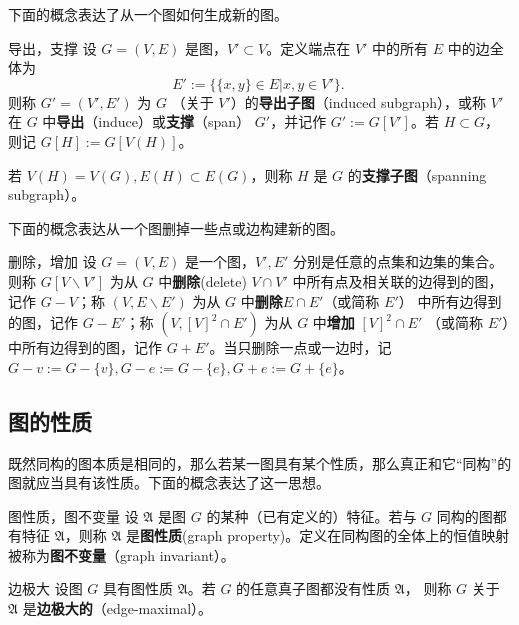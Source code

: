 下面的概念表达了从一个图如何生成新的图。

\begin{definition}{导出，支撑}
设 $G=(V,E)$ 是图，$V'\subset V$。定义端点在 $V'$ 中的所有 $E$ 中的边全体为
\begin{equation}
E':=\{\{x,y\}\in E|x,y\in V'\}.~
\end{equation}
则称 $G'=(V',E')$ 为 $G$ （关于 $V'$）的\textbf{导出子图}（induced subgraph），或称 $V'$ 在 $G$ 中\textbf{导出}（induce）或\textbf{支撑}（span） $G'$，并记作 $G':=G[V']$。若 $H\subset G$，则记 $G[H]:=G[V(H)]$。

若 $V(H)=V(G),E(H)\subset E(G)$，则称 $H$ 是 $G$ 的\textbf{支撑子图}（spanning subgraph）。
\end{definition}
下面的概念表达从一个图删掉一些点或边构建新的图。
\begin{definition}{删除，增加}
设 $G=(V,E)$ 是一个图，$V',E'$ 分别是任意的点集和边集的集合。则称 $G[V\backslash V']$ 为从 $G$ 中\textbf{删除}(delete) $V\cap V'$ 中所有点及相关联的边得到的图，记作 $G-V$；称
 $(V,E\backslash E')$ 为从 $G$ 中\textbf{删除}$E\cap E'$（或简称 $E'$） 中所有边得到的图，记作 $G-E'$；称 $(V,[V]^2\cap E')$ 为从 $G$ 中\textbf{增加} $[V]^2\cap E'$ （或简称 $E'$）中所有边得到的图，记作 $G+E'$。当只删除一点或一边时，记 $G-v:=G-\{v\},G-e:=G-\{e\},G+e:=G+\{e\}$。
\end{definition}





\subsection{图的性质}
既然同构的图本质是相同的，那么若某一图具有某个性质，那么真正和它“同构”的图就应当具有该性质。下面的概念表达了这一思想。
\begin{definition}{图性质，图不变量}
设 $\mathfrak A$ 是图 $G$ 的某种（已有定义的）特征。若与 $G$ 同构的图都有特征 $\mathfrak A$，则称 $\mathfrak A$ 是\textbf{图性质}(graph property)。定义在同构图的全体上的恒值映射被称为\textbf{图不变量}（graph invariant）。
\end{definition}

\begin{definition}{边极大}
设图 $G$ 具有图性质 $\mathfrak A$。若 $G$ 的任意真子图都没有性质 $\mathfrak A$， 则称 $G$ 关于  $\mathfrak A$ 是\textbf{边极大的}（edge-maximal）。
\end{definition}

